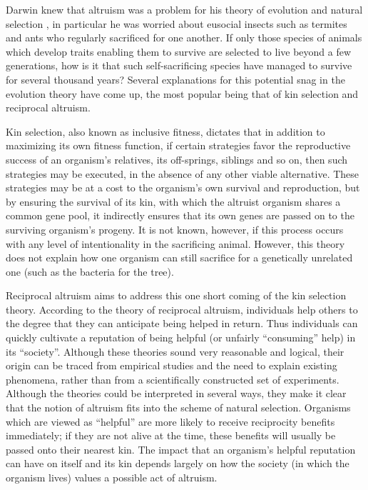 \documentclass[12pt, letter]{article}
\begin{document}
Darwin knew that altruism was a problem for his theory of evolution and natural selection \cite{warneken2009roots}, in particular he was worried about eusocial insects such as termites and ants who regularly sacrificed for one another. If only those species of animals which develop traits enabling them to survive are selected to live beyond a few generations, how is it that such self-sacrificing species have managed to survive for several thousand years? Several explanations for this potential snag in the evolution theory have come up, the most popular being that of kin selection and reciprocal altruism.

Kin selection, also known as inclusive fitness, dictates that in addition to maximizing its own fitness function, if certain strategies favor the reproductive success of an organism's relatives, its off-springs, siblings and so on, then such strategies may be executed, in the absence of any other viable alternative. These strategies may be at a cost to the organism's own survival and reproduction, but by ensuring the survival of its kin, with which the altruist organism shares a common gene pool, it indirectly ensures that its own genes are passed on to the surviving organism's progeny. It is not known, however, if this process occurs with any level of intentionality in the sacrificing animal. However, this theory does not explain how one organism can still sacrifice for a genetically unrelated one (such as the bacteria for the tree).

Reciprocal altruism aims to address this one short coming of the kin selection theory. According to the theory of reciprocal altruism, individuals help others to the degree that they can anticipate being helped in return. Thus individuals can quickly cultivate a reputation of being helpful (or unfairly ``consuming'' help) in its ``society''. Although these theories sound very reasonable and logical, their origin can be traced from empirical studies and the need to explain existing phenomena, rather than from a scientifically constructed set of experiments. Although the theories could be interpreted in several ways, they make it clear that the notion of altruism fits into the scheme of natural selection. Organisms which are viewed as ``helpful'' are more likely to receive reciprocity benefits immediately; if they are not alive at the time, these benefits will usually be passed onto their nearest kin. The impact that an organism's helpful reputation can have on itself and its kin depends largely on how the society (in which the organism lives) values a possible act of altruism.
\end{document}
